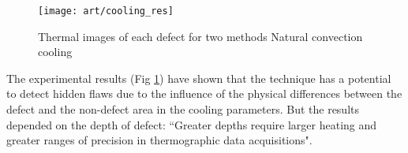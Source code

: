 \begin{figure}
	\hspace{-45pt}
	\texttt{[image: art/cooling\_res]}
	\caption{Thermal images of each defect for two methods Natural convection cooling}
	\label{cooling_res}
\end{figure}

The experimental results (Fig \ref{cooling_res}) have shown that the technique has a potential to detect hidden flaws due to the influence of the physical differences between the defect and the non-defect area in the cooling parameters. But the results depended on the depth of defect: ``Greater depths require larger heating and greater ranges of precision in thermographic data acquisitions". %

